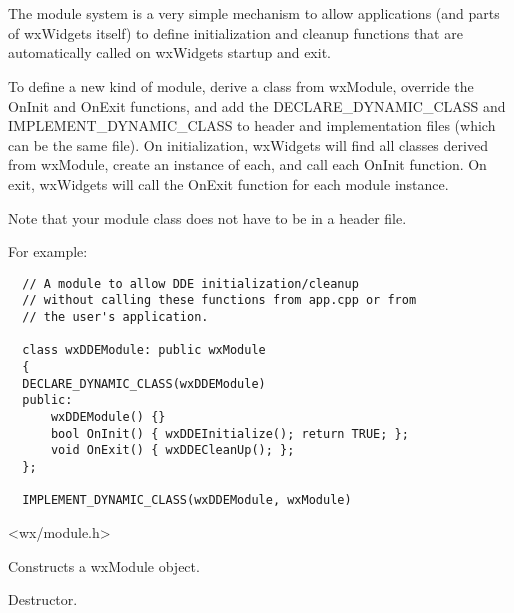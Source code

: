 \section{}\label{wxmodule}

The module system is a very simple mechanism to allow applications (and parts of wxWidgets itself) to
define initialization and cleanup functions that are automatically called on wxWidgets
startup and exit.

To define a new kind of module, derive a class from wxModule, override the OnInit and OnExit functions,
and add the DECLARE\_DYNAMIC\_CLASS and IMPLEMENT\_DYNAMIC\_CLASS to header and implementation files
(which can be the same file). On initialization, wxWidgets will find all classes derived from wxModule,
create an instance of each, and call each OnInit function. On exit, wxWidgets will call the OnExit
function for each module instance.

Note that your module class does not have to be in a header file.

For example:

\begin{verbatim}
  // A module to allow DDE initialization/cleanup
  // without calling these functions from app.cpp or from
  // the user's application.

  class wxDDEModule: public wxModule
  {
  DECLARE_DYNAMIC_CLASS(wxDDEModule)
  public:
      wxDDEModule() {}
      bool OnInit() { wxDDEInitialize(); return TRUE; };
      void OnExit() { wxDDECleanUp(); };
  };

  IMPLEMENT_DYNAMIC_CLASS(wxDDEModule, wxModule)
\end{verbatim}




<wx/module.h>


\label{wxmoduleconstr}


Constructs a wxModule object.



Destructor.

\label{wxmodulecleanupmodules}

